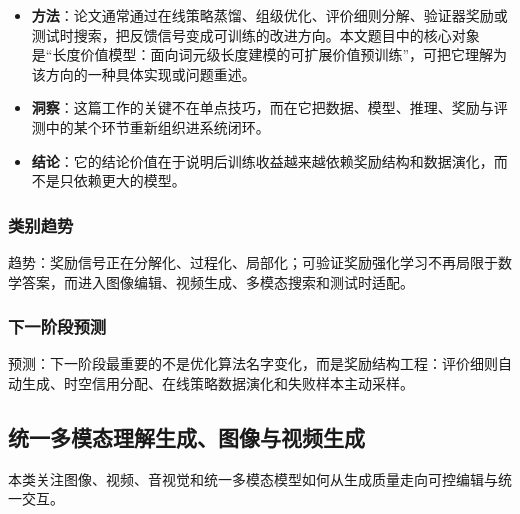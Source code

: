\begin{enumerate}[leftmargin=1.5em]
\begin{itemize}[leftmargin=1.5em]
    \item \textbf{方法}：论文通常通过在线策略蒸馏、组级优化、评价细则分解、验证器奖励或测试时搜索，把反馈信号变成可训练的改进方向。本文题目中的核心对象是“长度价值模型：面向词元级长度建模的可扩展价值预训练”，可把它理解为该方向的一种具体实现或问题重述。
    \item \textbf{洞察}：这篇工作的关键不在单点技巧，而在它把数据、模型、推理、奖励与评测中的某个环节重新组织进系统闭环。
    \item \textbf{结论}：它的结论价值在于说明后训练收益越来越依赖奖励结构和数据演化，而不是只依赖更大的模型。
  \end{itemize}
\end{enumerate}

\subsubsection{类别趋势}
趋势：奖励信号正在分解化、过程化、局部化；可验证奖励强化学习不再局限于数学答案，而进入图像编辑、视频生成、多模态搜索和测试时适配。

\subsubsection{下一阶段预测}
预测：下一阶段最重要的不是优化算法名字变化，而是奖励结构工程：评价细则自动生成、时空信用分配、在线策略数据演化和失败样本主动采样。

\subsection{统一多模态理解生成、图像与视频生成}

本类关注图像、视频、音视觉和统一多模态模型如何从生成质量走向可控编辑与统一交互。

